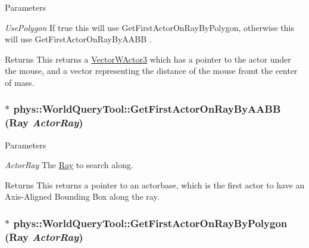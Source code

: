 \begin{DoxyParams}{Parameters}
\item[{\em UsePolygon}]If true this will use GetFirstActorOnRayByPolygon, otherwise this will use GetFirstActorOnRayByAABB . \end{DoxyParams}
\begin{DoxyReturn}{Returns}
This returns a \hyperlink{classphys_1_1VectorWActor3}{VectorWActor3} which has a pointer to the actor under the mouse, and a vector representing the distance of the mouse fromt the center of mass. 
\end{DoxyReturn}
\hypertarget{classphys_1_1WorldQueryTool_ac727c485571593a81d5828bfaf17e545}{
\subsubsection[{GetFirstActorOnRayByAABB}]{$\ast$ phys::WorldQueryTool::GetFirstActorOnRayByAABB ({\bf Ray} {\em ActorRay})}}
\label{d8/d69/classphys_1_1WorldQueryTool_ac727c485571593a81d5828bfaf17e545}

\begin{DoxyParams}{Parameters}
\item[{\em ActorRay}]The \hyperlink{classphys_1_1Ray}{Ray} to search along. \end{DoxyParams}
\begin{DoxyReturn}{Returns}
This returns a pointer to an actorbase, which is the first actor to have an Axis-\/Aligned Bounding Box along the ray. 
\end{DoxyReturn}
\hypertarget{classphys_1_1WorldQueryTool_af5864818aad3e6d44452ae6f6d0ba4b6}{
\subsubsection[{GetFirstActorOnRayByPolygon}]{ $\ast$ phys::WorldQueryTool::GetFirstActorOnRayByPolygon ({\bf Ray} {\em ActorRay})}}
\label{d8/d69/classphys_1_1WorldQueryTool_af5864818aad3e6d44452ae6f6d0ba4b6}


